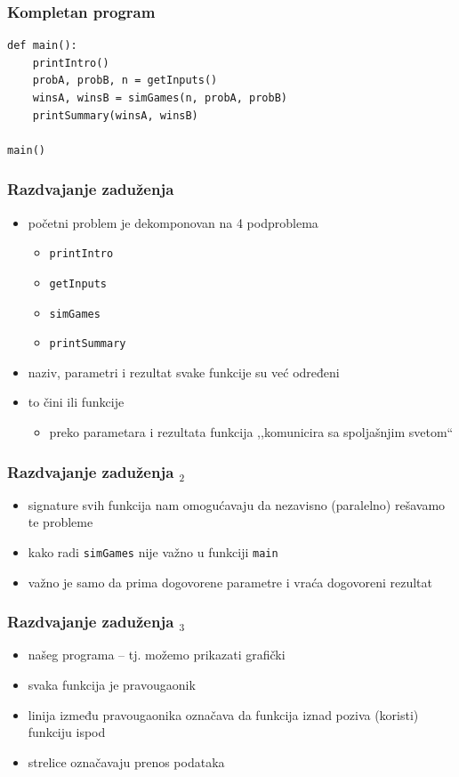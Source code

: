 \documentclass[utf8,compress,aspectratio=169]{beamer}
\begin{document}
\begin{frame}[fragile]
  \frametitle{Kompletan program}
\begin{verbatim}
def main():
    printIntro()
    probA, probB, n = getInputs()
    winsA, winsB = simGames(n, probA, probB)
    printSummary(winsA, winsB)

main()
\end{verbatim}
\end{frame}

\begin{frame}
  \frametitle{Razdvajanje zaduženja}
  \begin{itemize}
    \item početni problem je dekomponovan na 4 podproblema
    \begin{itemize}
      \item \texttt{printIntro}
      \item \texttt{getInputs}
      \item \texttt{simGames}
      \item \texttt{printSummary}
    \end{itemize}
    \item naziv, parametri i rezultat svake funkcije su već određeni
    \item to čini  ili  funkcije
    \begin{itemize}
      \item preko parametara i rezultata funkcija ,,komunicira sa spoljašnjim svetom``
    \end{itemize}
  \end{itemize}
\end{frame}

\begin{frame}
  \frametitle{Razdvajanje zaduženja $_2$}
  \begin{itemize}
    \item signature svih funkcija nam omogućavaju da nezavisno (paralelno) rešavamo te probleme
    \item kako radi \texttt{simGames} nije važno u funkciji \texttt{main}
    \item važno je samo da prima dogovorene parametre i vraća dogovoreni rezultat
  \end{itemize}
\end{frame}

\begin{frame}
  \frametitle{Razdvajanje zaduženja $_3$}
  \begin{itemize}
    \item {} našeg programa -- tj.  možemo prikazati grafički
    \item svaka funkcija je pravougaonik
    \item linija između pravougaonika označava da funkcija iznad poziva (koristi) funkciju ispod
    \item strelice označavaju prenos podataka
  \end{itemize}
\end{frame}
\end{document}
